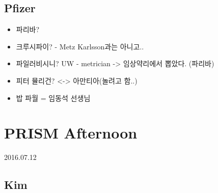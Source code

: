 \documentclass[]{book}
\providecommand{\tightlist}{%
  \setlength{\itemsep}{0pt}\setlength{\parskip}{0pt}}
\begin{document}
\subsection{Pfizer}\label{pfizer}

\begin{itemize}
\tightlist
\item
  파리바?
\item
  크루시파이? - Metz Karlsson과는 아니고..
\item
  파일러비시니? UW - metrician -\textgreater{} 임상약리에서 뽑았다.
  (파리바)
\item
  피터 뮬리건? \textless{}-\textgreater{} 아만티아(놀려고 함..)
\item
  밥 파월 = 임동석 선생님
\end{itemize}

\section{PRISM Afternoon}\label{prism-afternoon}

2016.07.12

\subsection{Kim}\label{kim}
\end{document}
